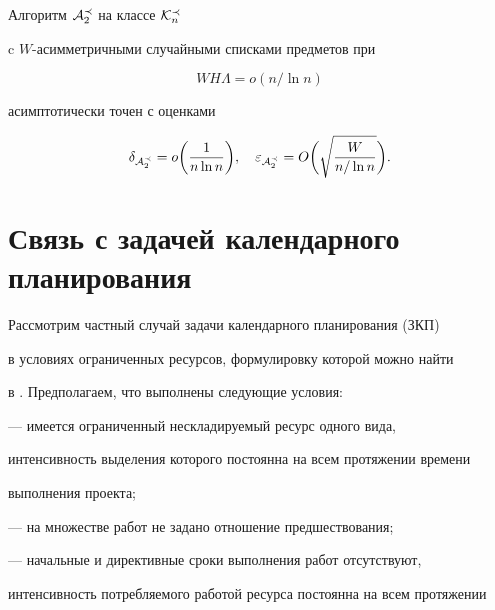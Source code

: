 \begin{thm}


\label{th4}


Алгоритм ${\cal A}_{2}^{\prec}$ на классе ${\cal K}_{n}^{\prec}$


c $W$-асимметричными случайными списками предметов при 


$$


WH\Lambda = o(n/ \ln n)


$$


асимптотически точен с оценками


$$


\delta_{{\cal A}_{2}^{\prec}}


=o\biggl(\frac {1}{n \ln n}\biggr),\quad


\eps_{{\cal A}_{2}^{\prec}}=


O\biggl(\sqrt {\frac {W}{n/\ln n}} \biggr).


$$


\end{thm}





\section {Связь с задачей календарного планирования}





Рассмотрим частный случай задачи календарного планирования (ЗКП) 


в условиях ограниченных ресурсов, формулировку которой можно найти


в \cite{G}. Предполагаем, что выполнены следующие условия:





--- имеется ограниченный нескладируемый ресурс одного вида,


интенсивность выделения которого постоянна на всем протяжении времени


выполнения проекта;





--- на множестве работ не задано отношение предшествования;





--- начальные и директивные сроки выполнения работ отсутствуют,


интенсивность потребляемого работой ресурса постоянна на всем протяжении


